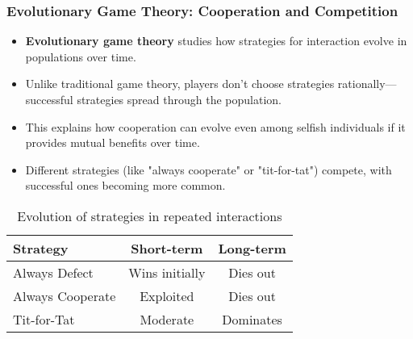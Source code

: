 \documentclass{beamer}
\begin{document}
	\begin{frame}
		\frametitle{Evolutionary Game Theory: Cooperation and Competition}
		\begin{itemize}
			\item \textbf{Evolutionary game theory} studies how strategies for interaction evolve in populations over time.
			\item Unlike traditional game theory, players don't choose strategies rationally—successful strategies spread through the population.
			\item This explains how cooperation can evolve even among selfish individuals if it provides mutual benefits over time.
			\item Different strategies (like "always cooperate" or "tit-for-tat") compete, with successful ones becoming more common.
		\end{itemize}
		\begin{table}
			\centering
			\small
			\begin{tabular}{|l|c|c|}
				\hline
				\textbf{Strategy} & \textbf{Short-term} & \textbf{Long-term} \\
				\hline
				Always Defect & Wins initially & Dies out \\
				Always Cooperate & Exploited & Dies out \\
				Tit-for-Tat & Moderate & Dominates \\
				\hline
			\end{tabular}
			\caption{Evolution of strategies in repeated interactions}
		\end{table}
	\end{frame}
	
\end{document}
